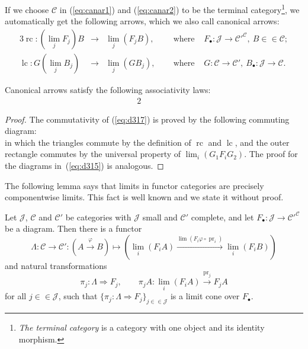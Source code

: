 \documentclass[10pt]{simplearticle}
\newcommand{\tikzinput}[1]{}
\newcommand{\pr}{\operatorname{pr}}
\newcommand{\rc}{\operatorname{rc}}
\newcommand{\lc}{\operatorname{lc}}
\begin{document}
\begin{rem}
If we choose $\mathcal{C}$ in (\ref{eq:canar1}) and (\ref{eq:canar2})
to be the terminal category\footnote{\emph{The terminal category} is a category with one object and its
identity morphism.}, we automatically get the following arrows, which we also call canonical
arrows:
\begin{alignat*}{3}
\rc\colon(\lim_{j}F_{j})B & \to & \lim_{j}(F_{j}B), &\ 
& \textrm{ where } & F_{\bullet}\colon\mathcal{J}\to\mathcal{C}'^{\mathcal{C}},~B\in\in\mathcal{C};\\
\lc\colon G(\lim_{j}B_{j}) & \to & \lim_{j}(GB_{j}), &\ 
& \textrm{ where } & G\colon\mathcal{C}\to\mathcal{C}',~B_{\bullet}\colon\mathcal{J}\to\mathcal{C}.
\end{alignat*}
\end{rem}

\begin{lem}\label{lem:almost-bimon}
Canonical arrows satisfy the following associativity
laws:
\begin{alignat}{2}
\tikzinput{d315} & \qquad & \tikzinput{d316}\label{eq:d315}
\end{alignat}
\begin{equation}
\tikzinput{d317}\label{eq:d317}
\end{equation}
\end{lem}

\begin{proof}
The commutativity of (\ref{eq:d317}) is proved by the following commuting
diagram:
\begin{equation}
\tikzinput{d341}\label{eq:limitsoffunctors-1}
\end{equation}
in which the triangles commute by the definition of $\rc$ and $\lc$,
and the outer rectangle commutes by the universal property of $\lim_{i}(G_{1}F_{i}G_{2})$.
The proof for the diagrams in~(\ref{eq:d315}) is analogous.
\end{proof}

The following lemma says that limits in functor categories are precisely
componentwise limits. This fact is well known and we state it without
proof.
\begin{lem}\label{lem:cw-lim}
Let $\mathcal{J}$, $\mathcal{C}$ and $\mathcal{C}'$
be
categories with $\mathcal{J}$ small and $\mathcal{C}'$
complete, and let $F_{\bullet}\colon\mathcal{J}\to\mathcal{C}'^{\mathcal{C}}$
be a diagram. Then there is a functor
\[
\Lambda\colon\mathcal{C}\to\mathcal{C}'\colon(A\xrightarrow{\varphi}B)\mapsto(\lim_{i}(F_{i}A)\xrightarrow{\lim(F_{i}\varphi\circ\pr_{i})}\lim_{i}(F_{i}B))
\]
and natural transformations
\[
\pi_{j}\colon\Lambda\Rightarrow F_{j},\qquad\pi_{j}A\colon\lim_{i}(F_{i}A)\xrightarrow{\pr_{j}}F_{j}A
\]
for all $j\in\in\mathcal{J}$, such that $\{\pi_{j}\colon\Lambda\Rightarrow F_{j}\}_{j\in\in\mathcal{J}}$
is a limit cone over $F_{\bullet}$.
\end{lem}
\end{document}
